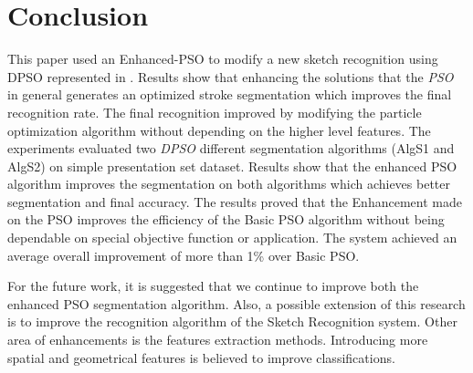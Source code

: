 \documentclass[10pt]{article}
\begin{document}
 
  
\section{Conclusion }
 \label{ConclusionandFutureWork}


This paper used an Enhanced-PSO  to modify a new sketch recognition using DPSO represented in \cite{mypaper}. Results show that enhancing the solutions that the \textit{PSO} in general generates an optimized stroke segmentation which improves the final recognition rate.  The final recognition improved by modifying the particle optimization algorithm without depending on the higher level features. The experiments evaluated two \textit{DPSO} different segmentation algorithms (AlgS1 and AlgS2) on simple presentation set dataset. Results show that the enhanced PSO algorithm improves the segmentation on both algorithms which achieves better segmentation and final accuracy. The results proved that the Enhancement made on the PSO improves the efficiency of the Basic PSO algorithm without being dependable on special objective function or application. The system achieved an average overall improvement of more than 1\% over Basic PSO.  

 For the future work, it is suggested that we continue to improve both the enhanced PSO segmentation algorithm. Also, a possible extension of this research is to improve the recognition algorithm of the Sketch Recognition system. Other area of enhancements is the features extraction methods. Introducing more spatial and geometrical features is believed to improve classifications.   %





\end{document}
